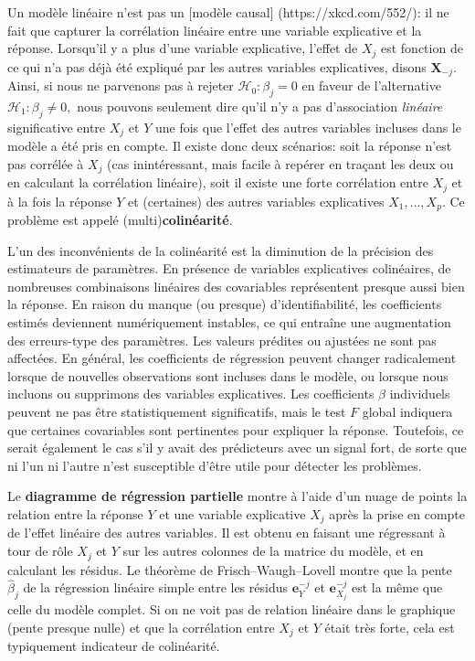 \documentclass[
  11pt,
  letterpaper,
]{scrbook}
\theoremstyle{plain}
\theoremstyle{plain}
\theoremstyle{definition}
\theoremstyle{definition}
\theoremstyle{remark}
\begin{document}
Un modèle linéaire n'est pas un {[}modèle causal{]}
(https://xkcd.com/552/): il ne fait que capturer la corrélation linéaire
entre une variable explicative et la réponse. Lorsqu'il y a plus d'une
variable explicative, l'effet de \(X_j\) est fonction de ce qui n'a pas
déjà été expliqué par les autres variables explicatives, disons
\(\boldsymbol{X}_{-j}.\) Ainsi, si nous ne parvenons pas à rejeter
\(\mathscr{H}_0:\beta_j=0\) en faveur de l'alternative
\(\mathscr{H}_1 : \beta_j \neq 0,\) nous pouvons seulement dire qu'il
n'y a pas d'association \emph{linéaire} significative entre \(X_j\) et
\(Y\) une fois que l'effet des autres variables incluses dans le modèle
a été pris en compte. Il existe donc deux scénarios: soit la réponse
n'est pas corrélée à \(X_j\) (cas inintéressant, mais facile à repérer
en traçant les deux ou en calculant la corrélation linéaire), soit il
existe une forte corrélation entre \(X_j\) et à la fois la réponse \(Y\)
et (certaines) des autres variables explicatives \(X_1, \ldots, X_p.\)
Ce problème est appelé (multi)\textbf{colinéarité}.

L'un des inconvénients de la colinéarité est la diminution de la
précision des estimateurs de paramètres. En présence de variables
explicatives colinéaires, de nombreuses combinaisons linéaires des
covariables représentent presque aussi bien la réponse. En raison du
manque (ou presque) d'identifiabilité, les coefficients estimés
deviennent numériquement instables, ce qui entraîne une augmentation des
erreurs-type des paramètres. Les valeurs prédites ou ajustées ne sont
pas affectées. En général, les coefficients de régression peuvent
changer radicalement lorsque de nouvelles observations sont incluses
dans le modèle, ou lorsque nous incluons ou supprimons des variables
explicatives. Les coefficients \(\beta\) individuels peuvent ne pas être
statistiquement significatifs, mais le test \(F\) global indiquera que
certaines covariables sont pertinentes pour expliquer la réponse.
Toutefois, ce serait également le cas s'il y avait des prédicteurs avec
un signal fort, de sorte que ni l'un ni l'autre n'est susceptible d'être
utile pour détecter les problèmes.

Le \textbf{diagramme de régression partielle} montre à l'aide d'un nuage
de points la relation entre la réponse \(Y\) et une variable explicative
\(X_j\) après la prise en compte de l'effet linéaire des autres
variables. Il est obtenu en faisant une régressant à tour de rôle
\(X_j\) et \(Y\) sur les autres colonnes de la matrice du modèle, et en
calculant les résidus. Le théorème de Frisch--Waugh--Lovell montre que
la pente \(\widehat{\beta}_j\) de la régression linéaire simple entre
les résidus \(\boldsymbol{e}_{Y}^{-j}\) et \(\boldsymbol{e}_{X_j}^{-j}\)
est la même que celle du modèle complet. Si on ne voit pas de relation
linéaire dans le graphique (pente presque nulle) et que la corrélation
entre \(X_j\) et \(Y\) était très forte, cela est typiquement indicateur
de colinéarité.
\end{document}
